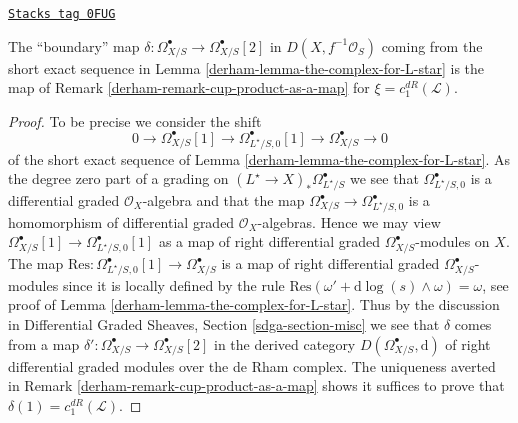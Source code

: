 \begin{lemma}
\label{derham-lemma-the-complex-for-L-star-gives-chern-class}
\href{https://stacks.math.columbia.edu/tag/0FUG}{\texttt{Stacks tag 0FUG}}

The ``boundary'' map
$\delta : \Omega^\bullet_{X/S} \to \Omega^\bullet_{X/S}[2]$
in $D(X, f^{-1}\mathcal{O}_S)$ coming from
the short exact sequence in Lemma \ref{derham-lemma-the-complex-for-L-star}
is the map of Remark \ref{derham-remark-cup-product-as-a-map}
for $\xi = c_1^{dR}(\mathcal{L})$.
\end{lemma}

\begin{proof}

To be precise we consider the shift
$$
0 \to \Omega^\bullet_{X/S}[1] \to
\Omega^\bullet_{L^\star/S, 0}[1] \to
\Omega^\bullet_{X/S} \to 0
$$
of the short exact sequence of Lemma \ref{derham-lemma-the-complex-for-L-star}.
As the degree zero part of a grading on
$(L^\star \to X)_*\Omega^\bullet_{L^\star/S}$
we see that $\Omega^\bullet_{L^\star/S, 0}$ is a differential
graded $\mathcal{O}_X$-algebra and that the map
$\Omega^\bullet_{X/S} \to \Omega^\bullet_{L^\star/S, 0}$
is a homomorphism of differential graded $\mathcal{O}_X$-algebras.
Hence we may view $\Omega^\bullet_{X/S}[1] \to
\Omega^\bullet_{L^\star/S, 0}[1]$ as a map of right differential graded
$\Omega^\bullet_{X/S}$-modules on $X$. The map
$\text{Res} : \Omega^\bullet_{L^\star/S, 0}[1] \to \Omega^\bullet_{X/S}$
is a map of right differential graded $\Omega^\bullet_{X/S}$-modules
since it is locally defined by the rule
$\text{Res}(\omega' + \text{d}\log(s) \wedge \omega) = \omega$, see
proof of Lemma \ref{derham-lemma-the-complex-for-L-star}.
Thus by the discussion in
Differential Graded Sheaves, Section \ref{sdga-section-misc}
we see that $\delta$ comes from a map
$\delta' : \Omega^\bullet_{X/S} \to \Omega^\bullet_{X/S}[2]$
in the derived category $D(\Omega^\bullet_{X/S}, \text{d})$
of right differential graded modules over the de Rham complex.
The uniqueness averted in Remark \ref{derham-remark-cup-product-as-a-map}
shows it suffices to prove that $\delta(1) = c_1^{dR}(\mathcal{L})$.


\end{proof}
